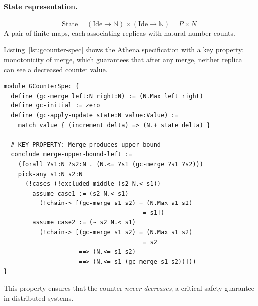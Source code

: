 \paragraph{State representation.}
\[
\text{State} = (\text{Ide} \to \mathbb{N}) \times (\text{Ide} \to \mathbb{N}) = P \times N
\]
A pair of finite maps, each associating replicas with natural number counts.

Listing~\ref{lst:gcounter-spec} shows the Athena specification with a key property: monotonicity of merge, which guarantees that after any merge, neither replica can see a decreased counter value.

\begin{lstlisting}[language=Athena,style=athena,label={lst:gcounter-spec},caption={GCounter specification and monotonicity property}]
module GCounterSpec {
  define (gc-merge left:N right:N) := (N.Max left right)
  define gc-initial := zero
  define (gc-apply-update state:N value:Value) :=
    match value { (increment delta) => (N.+ state delta) }
  
  # KEY PROPERTY: Merge produces upper bound
  conclude merge-upper-bound-left :=
    (forall ?s1:N ?s2:N . (N.<= ?s1 (gc-merge ?s1 ?s2)))
    pick-any s1:N s2:N
      (!cases (!excluded-middle (s2 N.< s1))
        assume case1 := (s2 N.< s1)
          (!chain-> [(gc-merge s1 s2) = (N.Max s1 s2)
                                       = s1])
        assume case2 := (~ s2 N.< s1)
          (!chain-> [(gc-merge s1 s2) = (N.Max s1 s2)
                                       = s2
                     ==> (N.<= s1 s2)
                     ==> (N.<= s1 (gc-merge s1 s2))]))
}
\end{lstlisting}

This property ensures that the counter \emph{never decreases}, a critical safety guarantee in distributed systems.

